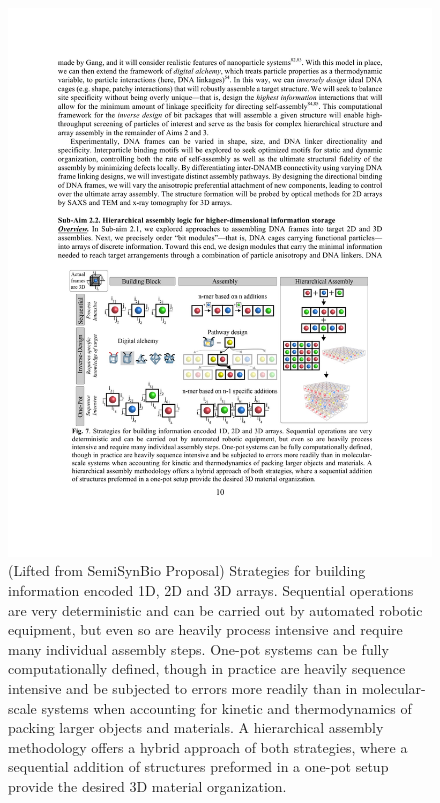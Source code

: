 \documentclass[12pt, oneside]{article}   	%
\begin{document}
\begin{figure}[t]
\begin{center}
\includegraphics[width=6.5in]{../figures/SemiSynBio.pdf}
\caption{
(Lifted from SemiSynBio Proposal) Strategies for building information encoded 1D, 2D and 3D arrays. Sequential operations are very deterministic and can be carried out by automated robotic equipment, but even so are heavily process intensive and require many individual assembly steps. One-pot systems can be fully computationally defined, though in practice are heavily sequence intensive and be subjected to errors more readily than in molecular- scale systems when accounting for kinetic and thermodynamics of packing larger objects and materials. A hierarchical assembly methodology offers a hybrid approach of both strategies, where a sequential addition of structures preformed in a one-pot setup provide the desired 3D material organization.}
\label{fig:semisynbio}
\end{center}
\end{figure}
\end{document}
